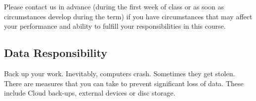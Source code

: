 \documentclass[12pt,letter,english]{report}
\begin{document}
Please contact us in advance (during the first week of class or as soon as circumstances develop during the term) if you have circumstances that may affect your performance and ability to fulfill your responsibilities in this course.

\subsection{Data Responsibility}

Back up your work. Inevitably, computers crash. Sometimes they get stolen. There are measures that you can take to prevent significant loss of data. These include Cloud back-ups, external devices or disc storage.
\end{document}
